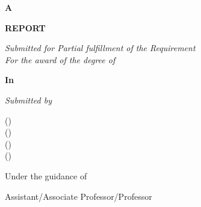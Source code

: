 \thispagestyle{empty}
\begin{center}
    { \large {\bfseries {\mytitle}} \par}
\vspace{0.4\baselineskip}
    {\large \textbf{A} \par}
\vspace{0.4\baselineskip}
    {\large \textbf{REPORT} \par} %
\vspace{0.4\baselineskip}
    {\textit{Submitted for Partial fulfillment of the Requirement}\\
    \textit{For the award of the degree of}}\par
\vspace{0.4\baselineskip}
    {\large \bf \mydegree \par} 
\vspace{0.4\baselineskip}
{\large \textbf{In} \par}
\vspace{0.4\baselineskip}
    {\large \bf \branch \par} 
\vspace{0.4\baselineskip}
    {\textit{Submitted by} \par}
\vspace{0.4\baselineskip}
\large\studentNamea (\NewRollNoa) \\
\large\studentNameb (\NewRollNob) \\
\large\studentNamec (\NewRollNoc) \\
\large\studentNamed (\NewRollNod) \\
\vspace{0.4\baselineskip}
    {Under the guidance of \par}
\vspace{0.2\baselineskip}
    {{\large \bf \mysupervisor} \par}
\vspace{0.2\baselineskip}
    {Assistant/Associate Professor/Professor \par}
\vspace{0.4\baselineskip}

\end{center}
